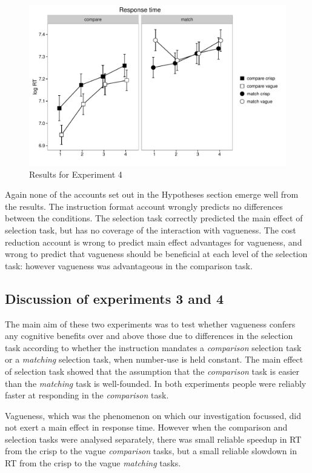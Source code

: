 \documentclass[
a4paper 
, doc
, longtable
]{apa6}
\begin{document}
\begin{figure}[htbp]
\centering
\includegraphics[width=.75\textwidth]{images/response-time-two-panels-1-e4.pdf}
\caption{Results for Experiment 4}
\label{resultse4}
\end{figure}

Again none of the accounts set out in the Hypotheses section emerge well from the results. The instruction format account wrongly predicts no differences between the conditions. The selection task correctly predicted the main effect of selection task, but has no coverage of the interaction with vagueness. The cost reduction account is wrong to predict main effect advantages for vagueness, and wrong to predict that vagueness should be beneficial at each level of the selection task: however vagueness was advantageous in the comparison task.

\subsection{Discussion of experiments 3 and 4}

The main aim of these two experiments was to test whether vagueness confers any cognitive benefits over and above those due to differences in the selection task according to whether the instruction mandates a \emph{comparison} selection task or a \emph{matching} selection task, when number-use is held constant.  The main effect of selection task showed that the assumption that the \emph{comparison} task is easier than the \emph{matching} task is well-founded. In both experiments people were reliably faster at responding in the \emph{comparison} task. 

Vagueness, which was the phenomenon  on which our investigation focussed, did not exert a main effect in response time. However when the comparison and selection tasks were analysed separately, there was small reliable speedup in RT from the crisp to the vague \emph{comparison} tasks, but a small reliable slowdown in RT from the crisp to the vague \emph{matching} tasks. 
\end{document}
